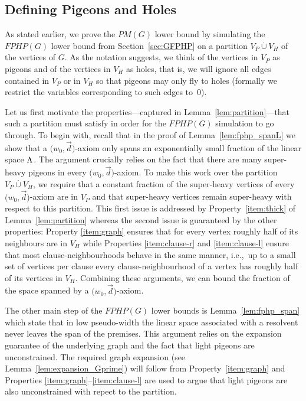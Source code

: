\documentclass{article}
\newcommand{\disjointunion}{\overset{.}{\cup}}
\newcommand{\ie}{i.e.,\ }
\newcommand{\refsec}[1]{Section~\ref{#1}}
\newcommand{\reflem}[1]{Lemma~\ref{#1}}
\newcommand{\formulaformat}[1]{\mathit{#1}}
\newcommand{\graphfphpnot}[1][G]{\formulaformat{FPHP}({#1})}
\newcommand{\sheavy}{super-heavy\xspace}
\newcommand{\light}{light\xspace}
\newcommand{\GFPHP}{G\text{-}FPHP}
\newcommand{\PM}{PM(G)}
\renewcommand{\GFPHP}{\graphfphpnot[G]}
\renewcommand{\PM}{\formulaformat{PM}(G)}
\newcommand{\V}[1][]{V_{#1}}
\newcommand{\Vp}{\V[P]}
\newcommand{\Vh}{\V[H]}
\newcommand{\vecthr}{\vec{d}}
\newcommand{\linspace}[1][]{\ensuremath \Lambda_{{#1}}}
\newcommand{\fakeaxiom}{$\bigl( w_0, \vecthr \bigr)$-axiom\xspace}
\newcommand{\pseudowidth}{pseudo-width\xspace}
\newcommand{\squeezesubsection}[1]{\subsection{#1}}
\numberwithin{equation}{section}
\begin{document}
 

\squeezesubsection{Defining Pigeons and Holes}
\label{sec:onto_random}


As stated earlier, we prove the $\PM$ lower bound by simulating the
$\GFPHP$ lower bound from \refsec{sec:GFPHP} on a partition
$\Vp \disjointunion \Vh$ of the vertices of $G$. As the notation
suggests, we think of the vertices in $\Vp$ as pigeons and of the
vertices in $\Vh$ as holes, that is, we will ignore all edges
contained in $\Vp$ or in $\Vh$ so that pigeons may only fly to holes
(formally we restrict the variables corresponding to such edges
to~$0$).

Let us first motivate the properties---captured in \reflem{lem:partition}---that  
such a partition must satisfy in order for the $\GFPHP$ simulation to
go through.
To begin with, recall that in the proof of \reflem{lem:fphp_spanL}
we show that a \fakeaxiom 
only spans an exponentially small fraction of the linear space
$\linspace$. 
The argument crucially relies on the fact that there are many \sheavy 
pigeons in every \fakeaxiom. 
To make this work over the partition $\Vp
\disjointunion \Vh$, we require that a constant fraction of the
\sheavy vertices of every
\fakeaxiom are in $\Vp$
and that \sheavy vertices remain \sheavy with
respect to this partition.
This first issue is addressed by Property~\ref{item:thick} of \reflem{lem:partition}
whereas the second issue is guaranteed by the other properties:
Property \ref{item:graph} ensures that for every vertex
roughly half of its neighbours are in $\Vh$ while Properties \ref{item:clause-r}
and \ref{item:clause-l} ensure that most clause-neighbourhoods behave
in the same manner, \ie up to a small set of vertices per clause
every clause-neighbourhood of a vertex has roughly half of its vertices in $\Vh$.
Combining these arguments, we can bound the fraction of the space spanned by a
\fakeaxiom.

The other main step of the $\GFPHP$ lower bounds is
\reflem{lem:fphp_span} which state that in low \pseudowidth the linear
space associated with a resolvent never leaves the span of the
premises.  This argument relies on the expansion guarantee of the
underlying graph and the fact that \light pigeons are unconstrained.
The required graph expansion (see \reflem{lem:expansion_Gprime}) 
will follow from 
Property~\ref{item:graph} and Properties
\ref{item:graph}--\ref{item:clause-l} are used to argue that
\light pigeons are also unconstrained with repect to the
partition.
\end{document}
